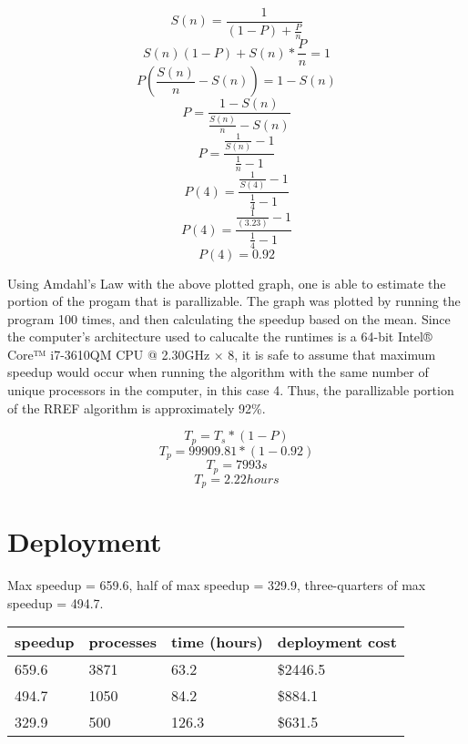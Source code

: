 \documentclass[11pt, a4paper]{article}
\begin{document}
$$S(n) = \frac{1}{(1-P)+\frac{P}{n}}$$
$$S(n)(1-P)+S(n)*\frac{P}{n} = 1$$
$$P(\frac{S(n)}{n}-S(n)) = 1-S(n)$$
$$P = \frac{1-S(n)}{\frac{S(n)}{n}-S(n)}$$
$$P = \frac{\frac{1}{S(n)}-1}{\frac{1}{n}-1}$$
$$P(4) = \frac{\frac{1}{S(4)}-1}{\frac{1}{4}-1}$$
$$P(4) = \frac{\frac{1}{(3.23)}-1}{\frac{1}{4}-1}$$
$$P(4) = 0.92$$

Using Amdahl's Law with the above plotted graph, one is able to estimate the portion of the progam that is parallizable. The graph was plotted by running the program 100 times, and then calculating the speedup based on the mean.
Since the computer's architecture used to calucalte the runtimes is a 64-bit Intel® Core™ i7-3610QM CPU @ 2.30GHz × 8, it is safe to assume that maximum speedup would occur when running the algorithm with the same number of unique processors in the computer, in this case 4. Thus, the parallizable portion of the RREF algorithm is approximately 92\%. 

$$T_p = T_s * (1-P)$$
$$T_p = 99909.81*(1-0.92)$$
$$T_p = 7993 s$$
$$T_p = 2.22 hours$$

\section[20]{Deployment}
Max speedup = 659.6, half of max speedup = 329.9, three-quarters of max speedup = 494.7.

\begin{tabular}{| l | l | l | l|}
	\hline
	\textbf{speedup} & \textbf{processes} & \textbf{time (hours)} & \textbf{deployment cost}\\ \hline
	659.6 & 3871 & 63.2 & \$2446.5\\ \hline
	494.7 & 1050 & 84.2 & \$884.1\\ \hline
	329.9 & 500 & 126.3 & \$631.5\\ \hline
\end{tabular}
\end{document}
